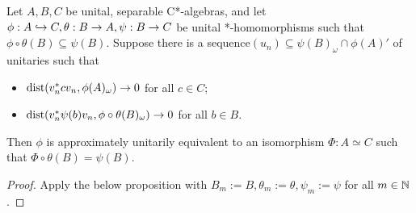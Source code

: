 \documentclass[12pt]{amsart}
\begin{document}
  \begin{prop}\label{relativeintertwining}
      Let $A,B,C$ be unital, separable C*-algebras, and let $\phi: A \hookrightarrow C, \theta: B \to A, \psi: B \to C$ be unital *-homomorphisms such that $\phi \circ \theta(B) \subseteq \psi(B)$. Suppose there is a sequence$(u_n) \subseteq \psi(B)_\omega \cap \phi(A)'$ of unitaries such that
        \begin{itemize}
          \item $\text{dist}(v_n^*cv_n,\phi(A)_\omega) \to 0$ for all $c \in C$;
          \item $\text{dist}(v_n^*\psi(b)v_n,\phi \circ \theta(B)_\omega) \to 0$ for all $b \in B$.
        \end{itemize}
        Then $\phi$ is approximately unitarily equivalent to an isomorphism $\Phi: A \simeq C$ such that $\Phi \circ \theta(B) = \psi(B)$.
          \begin{proof}
            Apply the below proposition with $B_m := B, \theta_m := \theta, \psi_m := \psi$ for all $m \in \mathbb{N}$.
          \end{proof}
    \end{prop}
\end{document}

